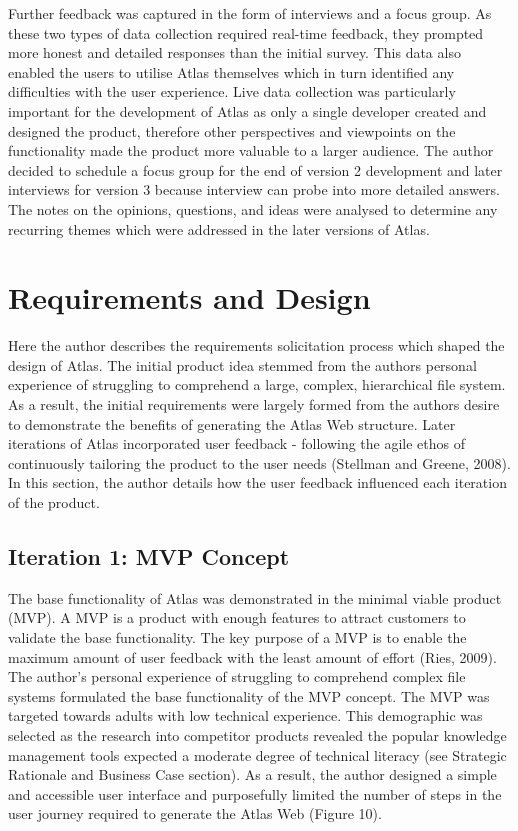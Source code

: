 \documentclass{article}
\begin{document}
Further feedback was captured in the form of interviews and a focus group. As these two types of data collection required real-time feedback, they prompted more honest and detailed responses than the initial survey. This data also enabled the users to utilise Atlas themselves which in turn identified any difficulties with the user experience. Live data collection was particularly important for the development of Atlas as only a single developer created and designed the product, therefore other perspectives and viewpoints on the functionality made the product more valuable to a larger audience. The author decided to schedule a focus group for the end of version 2 development and later interviews for version 3 because interview can probe into more detailed answers. The notes on the opinions, questions, and ideas were analysed to determine any recurring themes which were addressed in the later versions of Atlas.

\newpage
\section{Requirements and Design}

Here the author describes the requirements solicitation process which shaped the design of Atlas. The initial product idea stemmed from the authors personal experience of struggling to comprehend a large, complex, hierarchical file system. As a result, the initial requirements were largely formed from the authors desire to demonstrate the benefits of generating the Atlas Web structure. Later iterations of Atlas incorporated user feedback - following the agile ethos of continuously tailoring the product to the user needs (Stellman and Greene, 2008). In this section, the author details how the user feedback influenced each iteration of the product.

\subsection{Iteration 1: MVP Concept}

The base functionality of Atlas was demonstrated in the minimal viable product (MVP). A MVP is a product with enough features to attract customers to validate the base functionality. The key purpose of a MVP is to enable the maximum amount of user feedback with the least amount of effort (Ries, 2009). The author’s personal experience of struggling to comprehend complex file systems formulated the base functionality of the MVP concept. The MVP was targeted towards adults with low technical experience. This demographic was selected as the research into competitor products revealed the popular knowledge management tools expected a moderate degree of technical literacy (see Strategic Rationale and Business Case section). As a result, the author designed a simple and accessible user interface and purposefully limited the number of steps in the user journey required to generate the Atlas Web (Figure 10). 
\end{document}
